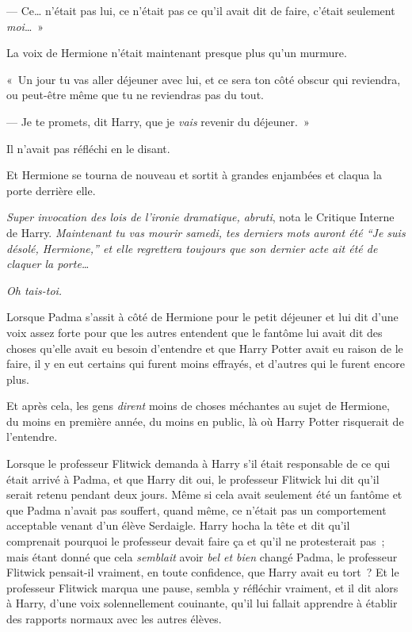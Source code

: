 --- Ce… n'était pas lui, ce n'était pas ce qu'il avait dit de faire, c'était seulement \emph{moi}…~»

La voix de Hermione n'était maintenant presque plus qu'un murmure.

«~Un jour tu vas aller déjeuner avec lui, et ce sera ton côté obscur qui reviendra, ou peut-être même que tu ne reviendras pas du tout.

--- Je te promets, dit Harry, que je \emph{vais} revenir du déjeuner.~»

Il n'avait pas réfléchi en le disant.

Et Hermione se tourna de nouveau et sortit à grandes enjambées et claqua la porte derrière elle.

\emph{Super invocation des lois de l'ironie dramatique, abruti}, nota le Critique Interne de Harry.
\emph{Maintenant tu vas mourir samedi, tes derniers mots auront été “Je suis désolé, Hermione,” et elle regrettera toujours que son dernier acte ait été de claquer la porte…}

\emph{Oh tais-toi.}

\later

Lorsque Padma s'assit à côté de Hermione pour le petit déjeuner et lui dit d'une voix assez forte pour que les autres entendent que le fantôme lui avait dit des choses qu'elle avait eu besoin d'entendre et que Harry Potter avait eu raison de le faire, il y en eut certains qui furent moins effrayés, et d'autres qui le furent encore plus.

Et après cela, les gens \emph{dirent} moins de choses méchantes au sujet de Hermione, du moins en première année, du moins en public, là où Harry Potter risquerait de l'entendre.

Lorsque le professeur Flitwick demanda à Harry s'il était responsable de ce qui était arrivé à Padma, et que Harry dit oui, le professeur Flitwick lui dit qu'il serait retenu pendant deux jours.
Même si cela avait seulement été un fantôme et que Padma n'avait pas souffert, quand même, ce n'était pas un comportement acceptable venant d'un élève Serdaigle.
Harry hocha la tête et dit qu'il comprenait pourquoi le professeur devait faire ça et qu'il ne protesterait pas~; mais étant donné que cela \emph{semblait} avoir \emph{bel et bien} changé Padma, le professeur Flitwick pensait-il vraiment, en toute confidence, que Harry avait eu tort~?
Et le professeur Flitwick marqua une pause, sembla y réfléchir vraiment, et il dit alors à Harry, d'une voix solennellement couinante, qu'il lui fallait apprendre à établir des rapports normaux avec les autres élèves.

